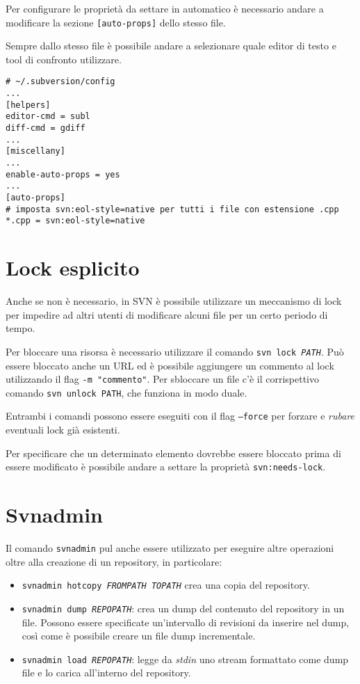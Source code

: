 Per configurare le proprietà da settare in automatico è necessario andare a modificare la sezione \texttt{[auto-props]} dello stesso file.

Sempre dallo stesso file è possibile andare a selezionare quale editor di testo e tool di confronto utilizzare.

\begin{lstlisting}
# ~/.subversion/config
...
[helpers]
editor-cmd = subl
diff-cmd = gdiff
...
[miscellany]
...
enable-auto-props = yes
...
[auto-props]
# imposta svn:eol-style=native per tutti i file con estensione .cpp
*.cpp = svn:eol-style=native 
\end{lstlisting}

\section{Lock esplicito}

Anche se non è necessario, in SVN è possibile utilizzare un meccanismo di lock per impedire ad altri utenti di modificare alcuni file per un certo periodo di tempo.

Per bloccare una risorsa è necessario utilizzare il comando \texttt{svn lock \textit{PATH}}. Può essere bloccato anche un URL ed è possibile aggiungere un commento al lock utilizzando il flag \texttt{-m "commento"}.
Per sbloccare un file c'è il corrispettivo comando \texttt{svn unlock PATH}, che funziona in modo duale. 

Entrambi i comandi possono essere eseguiti con il flag \texttt{--force} per forzare e \textit{rubare} eventuali lock già esistenti.

Per specificare che un determinato elemento dovrebbe essere bloccato prima di essere modificato è possibile andare a settare la proprietà \texttt{svn:needs-lock}.

\section{Svnadmin}

Il comando \texttt{svnadmin} pul anche essere utilizzato per eseguire altre operazioni oltre alla creazione di un repository, in particolare:

\begin{itemize}
	\item \texttt{svnadmin hotcopy \textit{FROMPATH TOPATH}} crea una copia del repository.
	\item \texttt{svnadmin dump \textit{REPOPATH}}: crea un dump del contenuto del repository in un file. Possono essere specificate un'intervallo di revisioni da inserire nel dump, così come è possibile creare un file dump incrementale. 
	\item \texttt{svnadmin load \textit{REPOPATH}}: legge da \textit{stdin} uno stream formattato come dump file e lo carica all'interno del repository.
\end{itemize}

